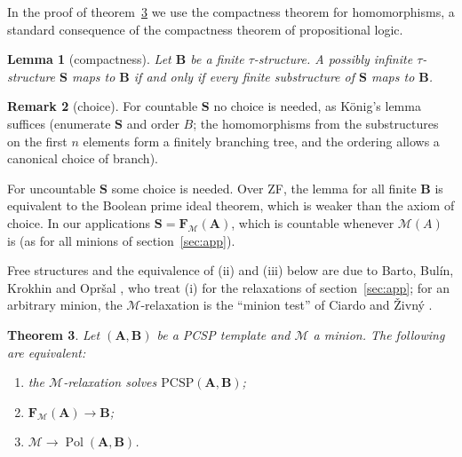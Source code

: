 \documentclass[11pt]{article}
\theoremstyle{plain}
\newtheorem{theorem}{Theorem}[section]
\newtheorem{lemma}[theorem]{Lemma}
\theoremstyle{definition}
\newtheorem{remark}[theorem]{Remark}
\newcommand{\Pol}{\operatorname{Pol}}
\newcommand{\bA}{\mathbf{A}}
\newcommand{\bB}{\mathbf{B}}
\newcommand{\bF}{\mathbf{F}}
\newcommand{\M}{\mathscr{M}}
\newcommand{\PCSP}{\mathrm{PCSP}}
\begin{document}
In the proof of theorem~\ref{thm:pcsp} we use the compactness theorem for homomorphisms, a standard consequence of the compactness theorem of propositional logic.

\begin{lemma}[compactness]\label{lem:compactness}
Let $\bB$ be a finite $\tau$-structure. A possibly infinite $\tau$-structure $\mathbf S$ maps to $\bB$ if and only if every finite substructure of $\mathbf S$ maps to $\bB$.
\end{lemma}

\begin{remark}[choice]\label{rem:choice}
For countable $\mathbf S$ no choice is needed, as König's lemma suffices (enumerate $\mathbf S$ and order $B$; the homomorphisms from the substructures on the first $n$ elements form a finitely branching tree, and the ordering allows a canonical choice of branch).

For uncountable $\mathbf S$ some choice is needed. Over ZF, the lemma for all finite $\bB$ is equivalent to the Boolean prime ideal theorem, which is weaker than the axiom of choice. In our applications $\mathbf S=\bF_\M(\bA)$, which is countable whenever $\M(A)$ is (as for all minions of section~\ref{sec:app}).
\end{remark}

Free structures and the equivalence of (ii) and (iii) below are due to Barto, Bulín, Krokhin and Opršal \cite{BBKO}, who treat (i) for the relaxations of section~\ref{sec:app}; for an arbitrary minion, the $\M$-relaxation is the ``minion test'' of Ciardo and Živný \cite{CZ-CLAP,CZ-tensors}.

\begin{theorem}\label{thm:pcsp}
Let $(\bA,\bB)$ be a PCSP template and $\M$ a minion. The following are equivalent:
\begin{enumerate}[label=(\roman*)]
  \item the $\M$-relaxation solves $\PCSP(\bA,\bB)$;
  \item $\bF_\M(\bA)\to\bB$;
  \item $\M\to\Pol(\bA,\bB)$.
\end{enumerate}
\end{theorem}
\end{document}
